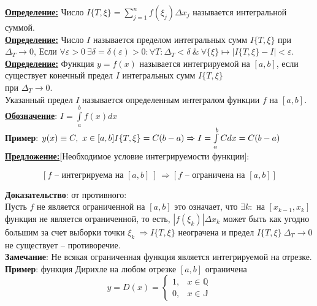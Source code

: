\documentclass[a4paper,12pt]{article} %
\begin{document}
	\underline{\textbf{Определение:}} Число $I\{T,\xi\} =  \sum\limits_{j = 1}^{n} {f(\xi_j)\Delta x_j}$ называется интегральной суммой.\\
	
	\underline{\textbf{Определение:}} Число $I$ называется пределом интегральных сумм $I\{T,\xi\}$ при $\Delta_T \longrightarrow 0$, Если $\forall\varepsilon>0~\exists\delta = \delta(\varepsilon)>0: \forall T:\Delta_{T}<\delta~\&~ \forall\{\xi\} \longmapsto|I\{T, \xi\}-I|<\varepsilon$.\\
	
	\underline{\textbf{Определение:}} Функция $y = f(x)$ называется интегрируемой на $[a,b]$, если существует конечный предел $I$ интегральных сумм $I\{T,\xi\}$\\ при $\Delta_T \longrightarrow 0$.\\
	Указанный предел $I$ называется определенным интегралом функции $f$ на $[a,b]$.\\
	
	\underline{\textbf{Обозначение}}: $I = \int\limits_{a}^{b} {f(x)dx}$\\
	
	\textbf{Пример}: $y(x)\equiv C,~x\in[a,b]\\
	I\{T,\xi\} = C(b-a) \Rightarrow I = \int\limits_{a}^{b} {Cdx} = C(b-a)$\\
	
	\underline{\textbf{Предложение:}}[Необходимое условие интегрируемости функции]:
	
	\[ [f \text{ -- интегрируема на }[a,b]~] \, \Rightarrow[ f \text{ -- ограничена на }[a,b] ] \]
	
	\textbf{Доказательство}: от противного:
	\\
	Пусть $f$ не является ограниченной на $[a,b]$ это означает, что $\exists k:$ на $[x_{k-1},x_k]$
	функция не является ограниченной, то есть, $|f(\xi_k)|\Delta x_k$ может быть как угодно большим за счет выборки точки $\xi_k~\Rightarrow I\{T,\xi\}$ неограчена и предел $I\{T,\xi\}~\Delta_T\rightarrow 0$ не существует -- противоречие.\\
	
	\textbf{Замечание}: Не всякая ограниченная функция является интегрируемой на отрезке.\\
	
	\textbf{Пример}: функция Дирихле на любом отрезке $[a,b]$ ограничена
	$$y=D(x)=\left\{\begin{array}{ll}
		1, & x \in \mathbb{Q} \\
		0, & x \in \mathbb{J}
	\end{array}\right.$$
	
\end{document}
